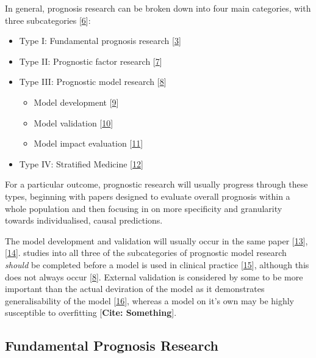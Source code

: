 \documentclass[
]{article}
\providecommand{\tightlist}{%
  \setlength{\itemsep}{0pt}\setlength{\parskip}{0pt}}
\begin{document}
In general, prognosis research can be broken down into four main categories, with three subcategories {[}\protect\hyperlink{ref-riley_prognosis_2019}{6}{]}:
\begin{itemize}
\tightlist
\item
  Type I: Fundamental prognosis research {[}\protect\hyperlink{ref-hemingway_prognosis_2013}{3}{]}
\item
  Type II: Prognostic factor research {[}\protect\hyperlink{ref-riley_prognosis_2013}{7}{]}
\item
  Type III: Prognostic model research {[}\protect\hyperlink{ref-steyerberg_prognosis_2013}{8}{]}
  \begin{itemize}
  \tightlist
  \item
    Model development {[}\protect\hyperlink{ref-royston_prognosis_2009}{9}{]}
  \item
    Model validation {[}\protect\hyperlink{ref-altman_prognosis_2009}{10}{]}
  \item
    Model impact evaluation {[}\protect\hyperlink{ref-moons_prognosis_2009}{11}{]}
  \end{itemize}
\item
  Type IV: Stratified Medicine {[}\protect\hyperlink{ref-hingorani_prognosis_2013}{12}{]}
\end{itemize}
For a particular outcome, prognostic research will usually progress through these types, beginning with papers designed to evaluate overall prognosis within a whole population and then focusing in on more specificity and granularity towards individualised, causal predictions.

The model development and validation will usually occur in the same paper {[}\protect\hyperlink{ref-collins_transparent_2015}{13}{]}, {[}\protect\hyperlink{ref-moons_transparent_2015}{14}{]}. studies into all three of the subcategories of prognostic model research \emph{should} be completed before a model is used in clinical practice {[}\protect\hyperlink{ref-riley_external_2016}{15}{]}, although this does not always occur {[}\protect\hyperlink{ref-steyerberg_prognosis_2013}{8}{]}. External validation is considered by some to be more important than the actual deviration of the model as it demonstrates generalisability of the model {[}\protect\hyperlink{ref-collins_systematic_2013}{16}{]}, whereas a model on it's own may be highly susceptible to overfitting {[}\textbf{Cite: Something}{]}.

\hypertarget{fundamental-prognosis-research}{%
\subsection{Fundamental Prognosis Research}\label{fundamental-prognosis-research}}
\end{document}
